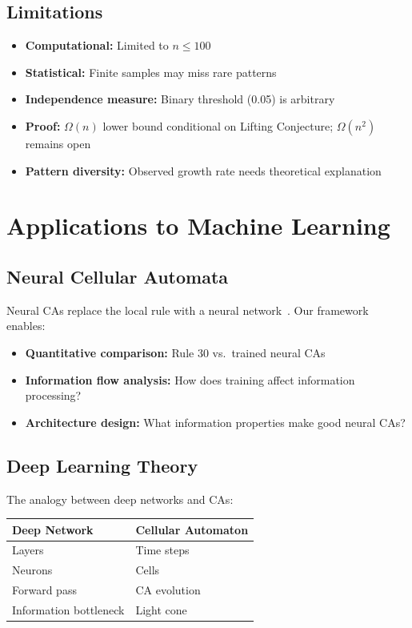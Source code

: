 \documentclass[11pt]{article}
\begin{document}
\subsection{Limitations}

\begin{itemize}
    \item \textbf{Computational:} Limited to $n \leq 100$
    \item \textbf{Statistical:} Finite samples may miss rare patterns
    \item \textbf{Independence measure:} Binary threshold (0.05) is arbitrary
    \item \textbf{Proof:} $\Omega(n)$ lower bound conditional on Lifting Conjecture; $\Omega(n^2)$ remains open
    \item \textbf{Pattern diversity:} Observed growth rate needs theoretical explanation
\end{itemize}

\section{Applications to Machine Learning}

\subsection{Neural Cellular Automata}

Neural CAs replace the local rule with a neural network~\citep{mordvintsev_2020}. Our framework enables:
\begin{itemize}
    \item \textbf{Quantitative comparison:} Rule 30 vs.\ trained neural CAs
    \item \textbf{Information flow analysis:} How does training affect information processing?
    \item \textbf{Architecture design:} What information properties make good neural CAs?
\end{itemize}

\subsection{Deep Learning Theory}

The analogy between deep networks and CAs:
\begin{center}
\begin{tabular}{@{}ll@{}}
\toprule
Deep Network & Cellular Automaton \\
\midrule
Layers & Time steps \\
Neurons & Cells \\
Forward pass & CA evolution \\
Information bottleneck & Light cone \\
\bottomrule
\end{tabular}
\end{center}
\end{document}

